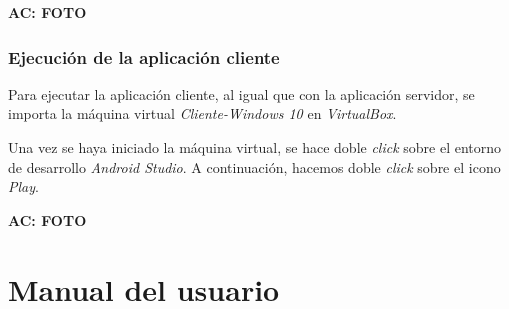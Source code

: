 \textbf{AC: FOTO}

\subsubsection{Ejecución de la aplicación cliente}
Para ejecutar la aplicación cliente, al igual que con la aplicación servidor, se importa la máquina virtual \textit{Cliente-Windows 10} en \textit{VirtualBox}.

Una vez se haya iniciado la máquina virtual, se hace doble \textit{click} sobre el entorno de desarrollo \textit{Android Studio}. A continuación, hacemos doble \textit{click} sobre el icono \textit{Play}.

\textbf{AC: FOTO}

\section{Manual del usuario}


